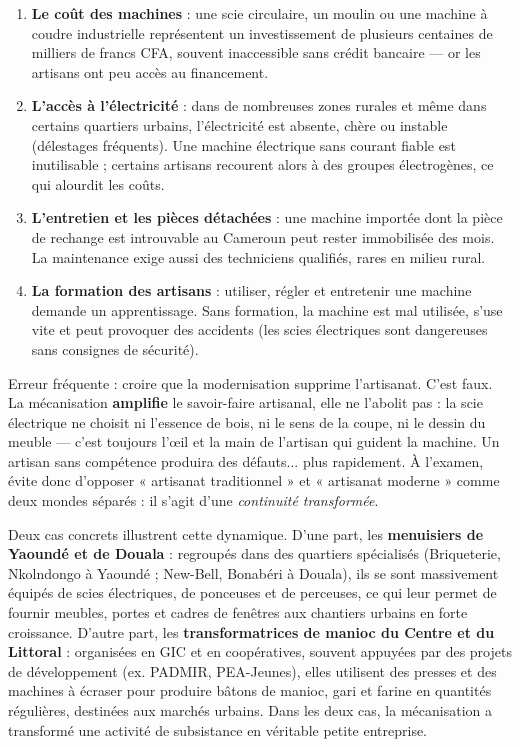 \documentclass[11pt]{article}
\newcounter{popsec}
\newcounter{popsub}
\newcommand{\courssub}[1]{%
  \stepcounter{popsub}%
  \par\vspace{9pt}\noindent{\popxbold\fontsize{11.5}{13}\selectfont\color{popink}{\color{poporange}\thepopsec.\thepopsub}\hspace{6pt}#1}\par\nopagebreak\vspace{4pt}
}
\begin{document}
\begin{enumerate}
\item \textbf{Le coût des machines} : une scie circulaire, un moulin ou une machine à coudre industrielle représentent un investissement de plusieurs centaines de milliers de francs CFA, souvent inaccessible sans crédit bancaire — or les artisans ont peu accès au financement.
\item \textbf{L'accès à l'électricité} : dans de nombreuses zones rurales et même dans certains quartiers urbains, l'électricité est absente, chère ou instable (délestages fréquents). Une machine électrique sans courant fiable est inutilisable ; certains artisans recourent alors à des groupes électrogènes, ce qui alourdit les coûts.
\item \textbf{L'entretien et les pièces détachées} : une machine importée dont la pièce de rechange est introuvable au Cameroun peut rester immobilisée des mois. La maintenance exige aussi des techniciens qualifiés, rares en milieu rural.
\item \textbf{La formation des artisans} : utiliser, régler et entretenir une machine demande un apprentissage. Sans formation, la machine est mal utilisée, s'use vite et peut provoquer des accidents (les scies électriques sont dangereuses sans consignes de sécurité).
\end{enumerate}

\begin{attention}
Erreur fréquente : croire que la modernisation supprime l'artisanat. C'est faux. La mécanisation \textbf{amplifie} le savoir-faire artisanal, elle ne l'abolit pas : la scie électrique ne choisit ni l'essence de bois, ni le sens de la coupe, ni le dessin du meuble — c'est toujours l'œil et la main de l'artisan qui guident la machine. Un artisan sans compétence produira des défauts... plus rapidement. À l'examen, évite donc d'opposer « artisanat traditionnel » et « artisanat moderne » comme deux mondes séparés : il s'agit d'une \emph{continuité transformée}.
\end{attention}

\courssub{Des exemples camerounais de modernisation réussie}

Deux cas concrets illustrent cette dynamique. D'une part, les \textbf{menuisiers de Yaoundé et de Douala} : regroupés dans des quartiers spécialisés (Briqueterie, Nkolndongo à Yaoundé ; New-Bell, Bonabéri à Douala), ils se sont massivement équipés de scies électriques, de ponceuses et de perceuses, ce qui leur permet de fournir meubles, portes et cadres de fenêtres aux chantiers urbains en forte croissance. D'autre part, les \textbf{transformatrices de manioc du Centre et du Littoral} : organisées en GIC et en coopératives, souvent appuyées par des projets de développement (ex. PADMIR, PEA-Jeunes), elles utilisent des presses et des machines à écraser pour produire bâtons de manioc, gari et farine en quantités régulières, destinées aux marchés urbains. Dans les deux cas, la mécanisation a transformé une activité de subsistance en véritable petite entreprise.
\end{document}
